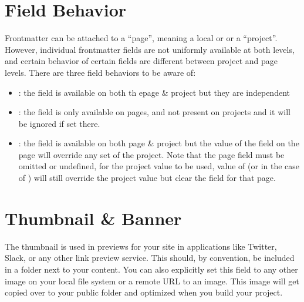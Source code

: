\documentclass[letterpaper,12pt,english]{sphinxmanual}
\begin{document}
\section{Field Behavior}
\label{\detokenize{notebooks/02-myst.integration:field-behavior}}
\sphinxAtStartPar
Frontmatter can be attached to a “page”, meaning a local  or  or a “project”. However, individual frontmatter fields are not uniformly available at both levels, and certain behavior of certain fields are different between project and page levels. There are three field behaviors to be aware of:
\begin{itemize}
\item {} 
\sphinxAtStartPar
{} : the field is available on both th epage \& project but they are independent

\item {} 
\sphinxAtStartPar
{} : the field is only available on pages, and not present on projects and it will be ignored if set there.

\item {} 
\sphinxAtStartPar
{} : the field is available on both page \& project but the value of the field on the page will override any set of the project. Note that the page field must be omitted or undefined, for the project value to be used, value of  (or \sphinxcode{\sphinxupquote{{[}{]}}} in the case of ) will still override the project value but clear the field for that page.

\end{itemize}


\section{Thumbnail \& Banner}
\label{\detokenize{notebooks/02-myst.integration:thumbnail-banner}}
\sphinxAtStartPar
The thumbnail is used in previews for your site in applications like Twitter, Slack, or any other link preview service. This should, by convention, be included in a  folder next to your content. You can also explicitly set this field to any other image on your local file system or a remote URL to an image. This image will get copied over to your public folder and optimized when you build your project.
\end{document}
